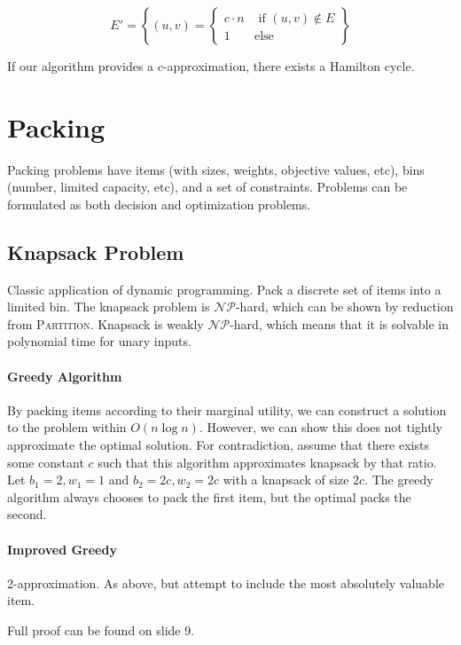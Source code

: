 \documentclass{idc_msc}
\newcommand{\NPclass}{\mathcal{NP}}
\begin{document}
\[
E' = \left\{(u,v) = \begin{cases}
c\cdot n & \text{ if }(u,v) \notin E \\
1 & \text{else}
\end{cases}\right\}
\]

If our algorithm provides a \(c\)-approximation, there exists a Hamilton cycle.

\section{Packing}

Packing problems have items (with sizes, weights, objective values, etc), bins (number, limited capacity, etc), and a set of constraints.
Problems can be formulated as both decision and optimization problems.

\subsection{Knapsack Problem}

Classic application of dynamic programming.
Pack a discrete set of items into a limited bin.
The knapsack problem is \(\NPclass\)-hard, which can be shown by reduction from \textsc{Partition}.
Knapsack is weakly \(\NPclass\)-hard, which means that it is solvable in polynomial time for unary inputs.

\paragraph{Greedy Algorithm}

By packing items according to their marginal utility, we can construct a solution to the problem within \(O(n \log n)\).
However, we can show this does not tightly approximate the optimal solution.
For contradiction, assume that there exists some constant \(c\) such that this algorithm approximates knapsack by that ratio.
Let \(b_1 = 2, w_1 = 1\) and \(b_2 = 2c, w_2 = 2c\) with a knapsack of size \(2c\).
The greedy algorithm always chooses to pack the first item, but the optimal packs the second.

\paragraph{Improved Greedy}

2-approximation.
As above, but attempt to include the most absolutely valuable item.

Full proof can be found on slide 9.
\end{document}
